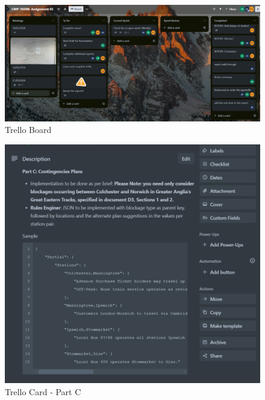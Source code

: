 \begin{figure}[!htbp]
    \centering
    \includegraphics[width=1\linewidth]{Diagrams/Group_work/trello_board.png}
    \caption{Trello Board}
    \label{Fig: trello_ss}
\end{figure}

\begin{figure}[!htbp]
    \centering
    \includegraphics[width=1\linewidth]{Diagrams/Group_work/trello_card.png}
    \caption{Trello Card - Part C}
    \label{Fig: trello_card_c}
\end{figure}

